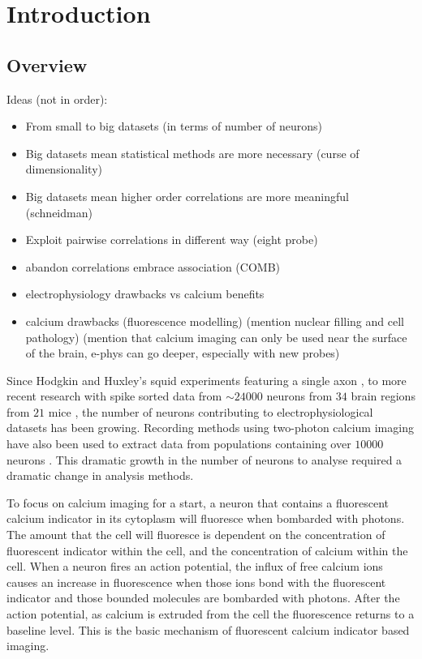 \chapter{Introduction}
\label{chap:intro}
\section{Overview}
Ideas (not in order):
\begin{itemize}
    \item From small to big datasets (in terms of number of neurons)
    \item Big datasets mean statistical methods are more necessary (curse of dimensionality)
    \item Big datasets mean higher order correlations are more meaningful (schneidman)
    \item Exploit pairwise correlations in different way (eight probe)
    \item abandon correlations embrace association (COMB)
    \item electrophysiology drawbacks vs calcium benefits
    \item calcium drawbacks (fluorescence modelling) (mention nuclear filling and cell pathology) (mention that calcium imaging can only be used near the surface of the brain, e-phys can go deeper, especially with new probes)
\end{itemize}

Since Hodgkin and Huxley's squid experiments featuring a single axon \parencite{hodgkin}, to more recent research with spike sorted data from  $\sim 24000$ neurons from $34$ brain regions from $21$ mice \parencite{allen}, the number of neurons contributing to electrophysiological datasets has been growing. Recording methods using two-photon calcium imaging have also been used to extract data from populations containing over $10000$ neurons \parencite{peron}. This dramatic growth in the number of neurons to analyse required a dramatic change in analysis methods.

To focus on calcium imaging for a start, a neuron that contains a fluorescent calcium indicator in its cytoplasm will fluoresce when bombarded with photons. The amount that the cell will fluoresce is dependent on the concentration of fluorescent indicator within the cell, and the concentration of calcium within the cell. When a neuron fires an action potential, the influx of free calcium ions causes an increase in fluorescence when those ions bond with the fluorescent indicator and those bounded molecules are bombarded with photons. After the action potential, as calcium is extruded from the cell the fluorescence returns to a baseline level. This is the basic mechanism of fluorescent calcium indicator based imaging.

